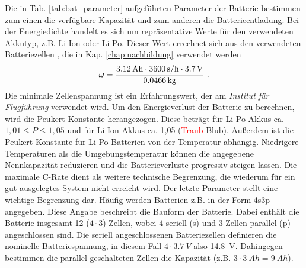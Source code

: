 Die in Tab. \ref{tab:bat_parameter} aufgeführten Parameter der Batterie bestimmen zum einen die verfügbare Kapazität und zum anderen die Batterieentladung. Bei der Energiedichte handelt es sich um repräsentative Werte für den verwendeten Akkutyp, z.B. Li-Ion oder Li-Po. Dieser Wert errechnet sich aus den verwendeten Batteriezellen \cite{batteriezelle}, die in Kap. \ref{chap:nachbildung} verwendet werden
\begin{equation}
	\omega = \frac{\SI{3.12}{Ah}\cdot \SI{3600}{s/h}\cdot \SI{3,7}{V}}{\SI{0.0466}{kg}} ~\text{.}
\end{equation}
Die minimale Zellenspannung ist ein Erfahrungswert, der am \textit{Institut für Flugführung} verwendet wird. Um den Energieverlust der Batterie zu berechnen, wird die Peukert-Konstante herangezogen. Diese beträgt für Li-Po-Akkus ca. $1,01 \leq P \leq 1,05$ und für Li-Ion-Akkus ca. 1,05 (\textcolor{red}{Traub} Blub). Außerdem ist die Peukert-Konstante für Li-Po-Batterien von der Temperatur abhängig. Niedrigere Temperaturen als die Umgebungstemperatur können die angegebene Nennkapazität reduzieren und die Batterieverluste progressiv steigen lassen. Die maximale C-Rate dient als weitere technische Begrenzung, die wiederum für ein gut ausgelegtes System nicht erreicht wird. Der letzte Parameter stellt eine wichtige Begrenzung dar.
Häufig werden Batterien z.B. in der Form 4s3p angegeben. Diese Angabe beschreibt die Bauform der Batterie. Dabei enthält die Batterie insgesamt 12 (\ensuremath{4\cdot 3}) Zellen, wobei 4 seriell (s) und 3 Zellen parallel (p) angeschlossen sind. Die seriell angeschlossenen Batteriezellen definieren die nominelle Batteriespannung, in diesem Fall \ensuremath{4\cdot \SI{3,7}{V}} also \SI{14,8}{V}. Dahingegen bestimmen die parallel geschalteten Zellen die Kapazität (z.B. \ensuremath{3\cdot \SI{3}{Ah} = \SI{9}{Ah}}).

